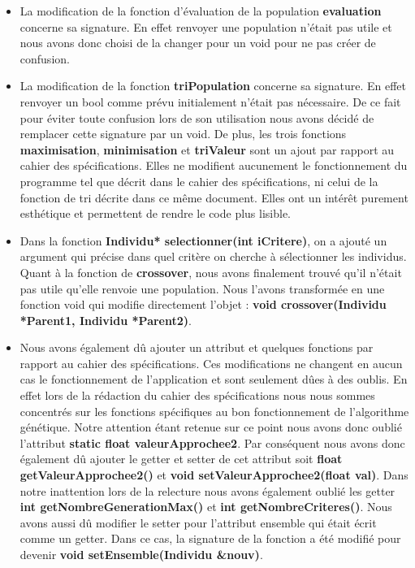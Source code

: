 \documentclass[a4paper,11pt]{article}
\begin{document}
\begin{itemize}
   					\item La modification de la fonction d’évaluation de la population \textbf{evaluation} concerne sa signature. En effet renvoyer une population n’était pas utile et nous avons donc choisi de la changer pour un void pour ne pas créer de confusion.

   					\item La modification de la fonction  \textbf{triPopulation} concerne sa signature. En effet renvoyer un bool comme prévu initialement n’était pas nécessaire. De ce fait pour éviter toute confusion lors de son utilisation nous avons décidé de remplacer cette signature par un void.
					De plus, les trois fonctions  \textbf{maximisation},  \textbf{minimisation} et  \textbf{triValeur} sont un ajout par rapport au cahier des spécifications. Elles ne modifient aucunement le fonctionnement du programme tel que décrit dans le cahier des spécifications, ni celui de la fonction de tri décrite dans ce même document. Elles ont un intérêt purement esthétique et permettent de rendre le code plus lisible.

					\item Dans la fonction  \textbf{Individu* selectionner(int iCritere)}, on a ajouté un argument qui précise dans quel critère on cherche à sélectionner les individus.
					Quant à la fonction de  \textbf{crossover}, nous avons finalement trouvé qu’il n’était pas utile qu’elle renvoie une population. Nous l’avons transformée en une fonction void qui modifie directement l’objet :  \textbf{void crossover(Individu *Parent1, Individu *Parent2)}.

					\item Nous avons également dû ajouter un attribut et quelques fonctions par rapport au cahier des spécifications. Ces modifications ne changent en aucun cas le fonctionnement de l’application et sont seulement dûes à des oublis. En effet lors de la rédaction du cahier des spécifications nous nous sommes concentrés sur les fonctions spécifiques au bon fonctionnement de l’algorithme génétique. Notre attention étant retenue sur ce point nous avons donc oublié l’attribut  \textbf{static float valeurApprochee2}. Par conséquent nous avons donc également dû ajouter le getter et setter de cet attribut soit  \textbf{float getValeurApprochee2()} et  \textbf{void setValeurApprochee2(float val)}. Dans notre inattention lors de la relecture nous avons également oublié les getter  \textbf{int getNombreGenerationMax()} et  \textbf{int getNombreCriteres()}. Nous avons aussi dû modifier le setter pour l’attribut ensemble qui était écrit comme un getter. Dans ce cas, la signature de la fonction a été modifié pour devenir  \textbf{void setEnsemble(Individu \&nouv)}.\\
				\end{itemize}
\end{document}
